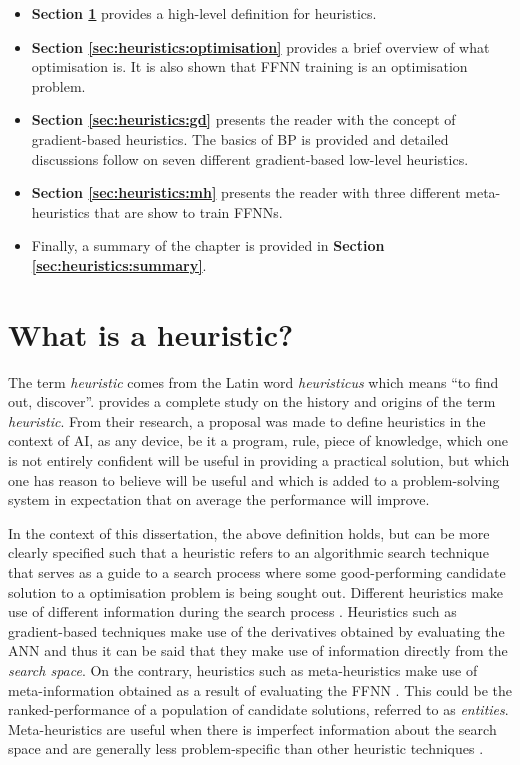 \begin{itemize}
      \item \textbf{Section \ref{sec:heuristics:what_is_a_heuristic}} provides a high-level definition for heuristics.

      \item \textbf{Section \ref{sec:heuristics:optimisation}} provides a brief overview of what optimisation is. It is also shown that \ac{FFNN} training is an optimisation problem.

      \item \textbf{Section \ref{sec:heuristics:gd}} presents the reader with the concept of gradient-based heuristics. The basics of \ac{BP} is provided and detailed discussions follow on seven different gradient-based low-level heuristics.

      \item \textbf{Section \ref{sec:heuristics:mh}} presents the reader with three different meta-heuristics that are show to train \acp{FFNN}.

      \item Finally, a summary of the chapter is provided in \textbf{Section \ref{sec:heuristics:summary}}.
\end{itemize}

\section{What is a heuristic?}
\label{sec:heuristics:what_is_a_heuristic}

The term \textit{heuristic} comes from the Latin word \textit{heuristicus} which means ``to find out, discover''. \citeauthor{ref:romanycia:1985} \cite{ref:romanycia:1985} provides a complete study on the history and origins of the term \textit{heuristic}. From their research, a proposal was made to define heuristics in the context of
\ac{AI}, as any device, be it a program, rule, piece of knowledge, which one is not entirely confident will be useful in providing a practical solution, but which one has reason to believe will be useful and which is added to a problem-solving system in expectation that on average the performance will improve.

In the context of this dissertation, the above definition holds, but can be more clearly specified such that a heuristic refers to an algorithmic search technique that serves as a guide to a search process where some good-performing candidate solution to a optimisation problem is being sought out. Different heuristics make use of different information during the search process \cite{ref:kheiri:2017}. Heuristics such as gradient-based techniques make use of the derivatives obtained by evaluating the \ac{ANN} and thus it can be said that they make use of information directly from the \textit{search space}. On the contrary, heuristics such as meta-heuristics make use of meta-information obtained as a result of evaluating the \ac{FFNN} \cite{ref:blum:2003}. This could be the ranked-performance of a population of candidate solutions, referred to as \textit{entities}. Meta-heuristics are useful when there is imperfect information about the search space \cite{ref:bianchi:2009} and are generally less problem-specific than other heuristic techniques \cite{ref:blum:2003}.

